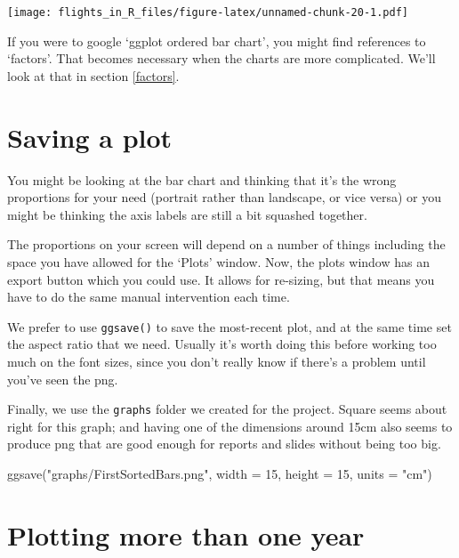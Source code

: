 \documentclass[
]{book}
\newenvironment{Shaded}{\begin{snugshade}}{\end{snugshade}}
\newcommand{\AttributeTok}[1]{\textcolor[rgb]{0.77,0.63,0.00}{#1}}
\newcommand{\DecValTok}[1]{\textcolor[rgb]{0.00,0.00,0.81}{#1}}
\newcommand{\FunctionTok}[1]{\textcolor[rgb]{0.00,0.00,0.00}{#1}}
\newcommand{\NormalTok}[1]{#1}
\newcommand{\StringTok}[1]{\textcolor[rgb]{0.31,0.60,0.02}{#1}}
\begin{document}
\texttt{[image: flights\_in\_R\_files/figure-latex/unnamed-chunk-20-1.pdf]}

If you were to google `ggplot ordered bar chart', you might find references to `factors'. That becomes necessary when the charts are more complicated. We'll look at that in section \ref{factors}.

\hypertarget{saving-a-plot}{%
\section{Saving a plot}\label{saving-a-plot}}

You might be looking at the bar chart and thinking that it's the wrong proportions for your need (portrait rather than landscape, or vice versa) or you might be thinking the axis labels are still a bit squashed together.

The proportions on your screen will depend on a number of things including the space you have allowed for the `Plots' window. Now, the plots window has an export button which you could use. It allows for re-sizing, but that means you have to do the same manual intervention each time.

We prefer to use \texttt{ggsave()} to save the most-recent plot, and at the same time set the aspect ratio that we need. Usually it's worth doing this before working too much on the font sizes, since you don't really know if there's a problem until you've seen the png.

Finally, we use the \texttt{graphs} folder we created for the project. Square seems about right for this graph; and having one of the dimensions around 15cm also seems to produce png that are good enough for reports and slides without being too big.

\begin{Shaded}
\begin{Highlighting}[]
\FunctionTok{ggsave}\NormalTok{(}\StringTok{"graphs/FirstSortedBars.png"}\NormalTok{, }\AttributeTok{width =} \DecValTok{15}\NormalTok{, }\AttributeTok{height =} \DecValTok{15}\NormalTok{, }\AttributeTok{units =} \StringTok{"cm"}\NormalTok{)}
\end{Highlighting}
\end{Shaded}

\hypertarget{plotting-more-than-one-year}{%
\section{Plotting more than one year}\label{plotting-more-than-one-year}}
\end{document}
